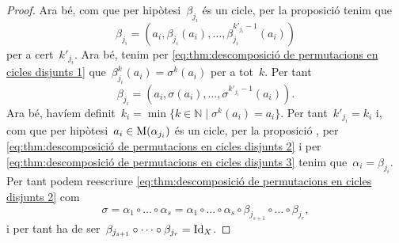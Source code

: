 \documentclass[../../main.tex]{subfiles}
\begin{document}
\begin{proof}
        Ara bé, com que per hipòtesi~\(\beta_{j_{i}}\) és un cicle, per la proposició  tenim que
        \[
            \beta_{j_{i}}=\left(a_{i},\beta_{j_{i}}(a_{i}),\dots,\beta^{k'_{j_{i}}-1}_{j_{i}}(a_{i})\right)
        \]
        per a cert~\(k'_{j_{i}}\).
        Ara bé, tenim per \eqref{eq:thm:descomposició de permutacions en cicles disjunts 1} que~\(\beta^{k}_{j_{i}}(a_{i})=\sigma^{k}(a_{i})\) per a tot~\(k\).
        Per tant
        \[
            \beta_{j_{i}}=\left(a_{i},\sigma(a_{i}),\dots,\sigma^{k'_{j_{i}}-1}(a_{i})\right).
        \]
        Ara bé, havíem definit~\(k_{i}=\min\{k\in\mathbb{N}\mid\sigma^{k}(a_{i})=a_{i}\}\).
        Per tant~\(k'_{j_{i}}=k_{i}\) i, com que per hipòtesi~\(a_{i}\in\operatorname{M}(\alpha_{j_{i}})\) és un cicle, per la proposició , per \eqref{eq:thm:descomposició de permutacions en cicles disjunts 2} i per \eqref{eq:thm:descomposició de permutacions en cicles disjunts 3} tenim que~\(\alpha_{i}=\beta_{j_{i}}\).
        Per tant podem reescriure \eqref{eq:thm:descomposició de permutacions en cicles disjunts 2} com
        \[
            \sigma=\alpha_{1}\circ\dots\circ\alpha_{s}=\alpha_{1}\circ\dots\circ\alpha_{s}\circ\beta_{j_{s+1}}\circ\dots\circ\beta_{j_{r}},
        \]
        i per tant ha de ser~\(\beta_{j_{s+1}}\circ\dots\circ\beta_{j_{r}}=\operatorname{Id}_{X}\).
    \end{proof}
\end{document}

